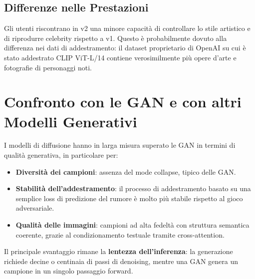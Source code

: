 \subsection{Differenze nelle Prestazioni}
\label{subsec:v1v2-perf}

Gli utenti riscontrano in v2 una minore capacità di controllare lo stile
artistico e di riprodurre celebrity rispetto a v1. Questo è probabilmente
dovuto alla differenza nei dati di addestramento: il dataset proprietario
di OpenAI su cui è stato addestrato CLIP ViT-L/14 contiene verosimilmente
più opere d'arte e fotografie di personaggi noti.

\section{Confronto con le GAN e con altri Modelli Generativi}
\label{sec:diffusion-vs-gans}

I modelli di diffusione hanno in larga misura superato le GAN in termini
di qualità generativa, in particolare per:

\begin{itemize}
  \item \textbf{Diversità dei campioni}: assenza del mode collapse,
        tipico delle GAN.
  \item \textbf{Stabilità dell'addestramento}: il processo di
        addestramento basato su una semplice loss di predizione del
        rumore è molto più stabile rispetto al gioco adversariale.
  \item \textbf{Qualità delle immagini}: campioni ad alta fedeltà
        con struttura semantica coerente, grazie al condizionamento
        testuale tramite cross-attention.
\end{itemize}

Il principale svantaggio rimane la \textbf{lentezza dell'inferenza}:
la generazione richiede decine o centinaia di passi di denoising, mentre
una GAN genera un campione in un singolo passaggio forward.


